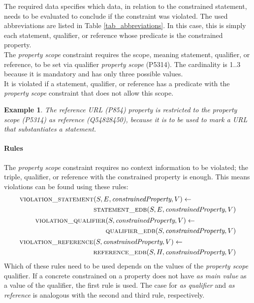 \documentclass[hyperref,bachelorofscience,fleqn]{cgvpub}
\newtheorem{example}{Example}
\begin{document}
The required data specifies which data, in relation to the constrained statement, needs to be evaluated to conclude if the constraint was violated. The used abbreviations are listed in Table \ref{tab_abbreviations}. In this case, this is simply each statement, qualifier, or reference whose predicate is the constrained property.\\
The \emph{property scope} constraint requires the scope, meaning statement, qualifier, or reference, to be set via qualifier \emph{property scope} (P5314). The cardinality is 1..3 because it is mandatory and has only three possible values.\\
It is violated if a statement, qualifier, or reference has a predicate with the \emph{property scope} constraint that does not allow this scope.\\

\begin{example}
The \emph{reference URL} (P854) property is restricted to the \emph{property scope} (P5314) \emph{as reference} (Q54828450), because it is to be used to mark a URL that substantiates a statement.
\end{example}

\paragraph{Rules}
The \emph{property scope} constraint requires no context information to be violated; the triple, qualifier, or reference with the constrained property is enough. This means violations can be found using these rules:
\begin{align}
\begin{split}
\textsc{violation\_statement}&(S, E, \emph{constrainedProperty}, V) \leftarrow \\
&\textsc{statement\_edb}(S, E, \emph{constrainedProperty}, V)\\
\end{split}\\
\begin{split}
\textsc{violation\_qualifier}&(S, \emph{constrainedProperty}, V) \leftarrow \\
&\textsc{qualifier\_edb}(S, \emph{constrainedProperty}, V)\\
\end{split}\\
\begin{split}
\textsc{violation\_reference}&(S, \emph{constrainedProperty}, V) \leftarrow \\
&\textsc{reference\_edb}(S, H, \emph{constrainedProperty}, V)\\
\end{split}
\end{align}
Which of these rules need to be used depends on the values of the \emph{property scope} qualifier. If a concrete constrained on a property does not have \emph{as main value} as a value of the qualifier, the first rule is used. The case for \emph{as qualifier} and \emph{as reference} is analogous with the second and third rule, respectively.
\end{document}
